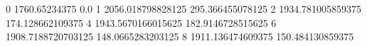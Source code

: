 0 1760.65234375 0.0
1 2056.018798828125 295.366455078125
2 1934.781005859375 174.128662109375
4 1943.5670166015625 182.9146728515625
6 1908.7188720703125 148.0665283203125
8 1911.136474609375 150.484130859375

